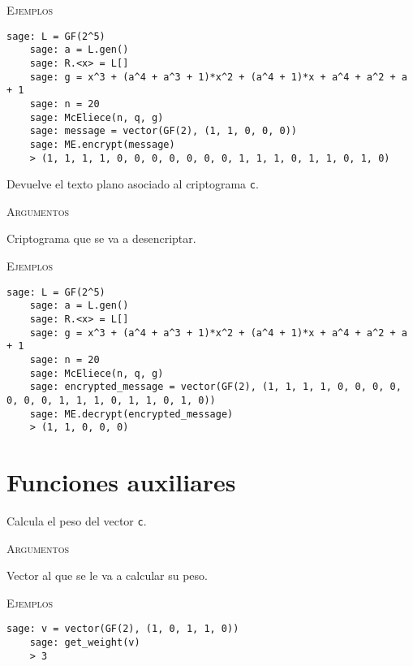 \begin{description}[leftmargin=1em, font=\normalfont\ttfamily, style=nextline]
\begin{description}[font=\ttfamily, style=nextline]
  \textsc{Ejemplos}
  \begin{lstlisting}[gobble=4]
    sage: L = GF(2^5)
    sage: a = L.gen()
    sage: R.<x> = L[]
    sage: g = x^3 + (a^4 + a^3 + 1)*x^2 + (a^4 + 1)*x + a^4 + a^2 + a + 1
    sage: n = 20
    sage: McEliece(n, q, g)
    sage: message = vector(GF(2), (1, 1, 0, 0, 0))
    sage: ME.encrypt(message)
    > (1, 1, 1, 1, 0, 0, 0, 0, 0, 0, 0, 1, 1, 1, 0, 1, 1, 0, 1, 0)
  \end{lstlisting}

  \item[decrypt(self, c)] Devuelve el texto plano asociado al criptograma \texttt{c}.

  \textsc{Argumentos}
  \begin{description}[font=\normalfont\ttfamily]
    \item[c] Criptograma que se va a desencriptar.
  \end{description}

  \textsc{Ejemplos}
  \begin{lstlisting}[gobble=4]
    sage: L = GF(2^5)
    sage: a = L.gen()
    sage: R.<x> = L[]
    sage: g = x^3 + (a^4 + a^3 + 1)*x^2 + (a^4 + 1)*x + a^4 + a^2 + a + 1
    sage: n = 20
    sage: McEliece(n, q, g)
    sage: encrypted_message = vector(GF(2), (1, 1, 1, 1, 0, 0, 0, 0, 0, 0, 0, 1, 1, 1, 0, 1, 1, 0, 1, 0))
    sage: ME.decrypt(encrypted_message)
    > (1, 1, 0, 0, 0)
  \end{lstlisting}
  \end{description}
\end{description}

\section{Funciones auxiliares}

\begin{description}[leftmargin=1em, font=\normalfont\ttfamily, style=nextline]
  \item[get\_weight(c)]

  Calcula el peso del vector \texttt{c}.

  \textsc{Argumentos}
  \begin{description}[font=\normalfont\ttfamily]
    \item[c] Vector al que se le va a calcular su peso.
  \end{description}

  \textsc{Ejemplos}
  \begin{lstlisting}[gobble=4]
    sage: v = vector(GF(2), (1, 0, 1, 1, 0))
    sage: get_weight(v)
    > 3
  \end{lstlisting}
\end{description}